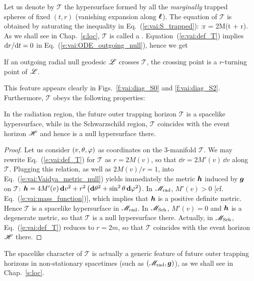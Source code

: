 Let us denote by $\mathscr{T}$ the hypersurface formed by
all the \emph{marginally} trapped spheres
of fixed $(t,r)$ (vanishing expansion along $\bm{\ell}$). The equation
of $\mathscr{T}$ is obtained by saturating the inequality
in Eq.~(\ref{e:vai:S_trapped}):
\be \label{e:vai:def_T}
    :\qquad r = 2M(t + r).
\ee
As we shall see in
Chap.~\ref{s:loc}, $\mathscr{T}$ is called a
.
Equation~(\ref{e:vai:def_T}) implies $\mathrm{d} r / \mathrm{d} t = 0$ in Eq.~(\ref{e:vai:ODE_outgoing_null}),
hence we get
\begin{prop}
If an outgoing radial null geodesic $\mathscr{L}$ crosses $\mathscr{T}$,
the crossing point is a $r$-turning point of $\mathscr{L}$.
\end{prop}
This feature appears clearly in Figs.~\ref{f:vai:diag_S0} and \ref{f:vai:diag_S2}.
Furthermore, $\mathscr{T}$ obeys the following properties:
\begin{prop}
In the radiation region, the future outer trapping horizon $\mathscr{T}$ is a
spacelike hypersurface, while in the Schwarzschild region, $\mathscr{T}$
coincides with the event horizon $\mathscr{H}$ and hence is a null hypersurface there.
\end{prop}
\begin{proof}
Let us consider $(v,\theta,\varphi)$ as coordinates on the 3-manifold $\mathscr{T}$.
We may rewrite Eq.~(\ref{e:vai:def_T}) for $\mathscr{T}$ as $r = 2M(v)$, so that
$\dd r = 2M'(v) \, \dd v$ along $\mathscr{T}$.
Plugging this relation, as well as $2M(v)/r=1$, into Eq.~(\ref{e:vai:Vaidya_metric_null})
yields immediately the metric $\bm{h}$ induced by $\bm{g}$ on $\mathscr{T}$:
$\bm{h} = 4 M'(v) \, \mathbf{d} v^2
        + r^2 \left( \mathbf{d}\theta^2 + \sin^2\theta\, \mathbf{d}\varphi^2 \right)$.
In $\mathscr{M}_{\rm rad}$, $M'(v) > 0$ [cf. Eq.~(\ref{e:vai:mass_function})], which
implies that $\bm{h}$ is a positive definite metric. Hence $\mathscr{T}$
is a spacelike hypersurface in $\mathscr{M}_{\rm rad}$. In $\mathscr{M}_{\rm Sch}$, $M'(v) = 0$ and $\bm{h}$
is a degenerate metric, so that $\mathscr{T}$ is a null hypersurface there.
Actually, in $\mathscr{M}_{\rm Sch}$, Eq.~(\ref{e:vai:def_T}) reduces
to $r = 2m$, so that $\mathscr{T}$ coincides with the event horizon $\mathscr{H}$ there.
\end{proof}

\begin{remark}
The spacelike character of $\mathscr{T}$ is actually a generic feature of future outer trapping horizons in non-stationary spacetimes (such as $(\mathscr{M}_{\rm rad},\bm{g})$),
as we shall see in Chap.~\ref{s:loc}.
\end{remark}

